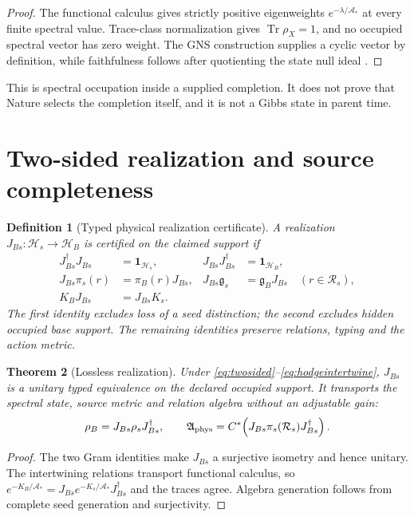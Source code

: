 \documentclass[11pt,a4paper]{article}
\newtheorem{definition}{Definition}[section]
\newtheorem{theorem}[definition]{Theorem}
\theoremstyle{remark}
\newcommand{\Aphys}{\mathfrak A_{\rm phys}}
\newcommand{\Hseed}{\mathcal H_s}
\newcommand{\Hbase}{\mathcal H_B}
\newcommand{\Tr}{\operatorname{Tr}}
\newcommand{\id}{\mathbf 1}
\begin{document}
\begin{proof}
The functional calculus gives strictly positive eigenweights
$e^{-\lambda/\mathcal A_*}$ at every finite spectral value.  Trace-class
normalization gives $\Tr\rho_X=1$, and no occupied spectral vector has zero
weight.  The GNS construction supplies a cyclic vector by definition, while
faithfulness follows after quotienting the state null ideal
\cite{gns1947,bratteli1987}.
\end{proof}

This is spectral occupation inside a supplied completion.  It does not prove
that Nature selects the completion itself, and it is not a Gibbs state in
parent time.

\section{Two-sided realization and source completeness}

\begin{definition}[Typed physical realization certificate]
A realization $J_{Bs}:\Hseed\to\Hbase$ is certified on the claimed support if
\begin{align}
 J_{Bs}^\dagger J_{Bs}&=\id_{\Hseed},
 &J_{Bs}J_{Bs}^\dagger&=\id_{\Hbase},
 \label{eq:twosided}\\
 J_{Bs}\pi_s(r)&=\pi_B(r)J_{Bs},
 &J_{Bs}\mathfrak g_s&=\mathfrak g_BJ_{Bs}
 \quad(r\in\mathcal R_s),
 \label{eq:intertwine}\\
 K_BJ_{Bs}&=J_{Bs}K_s.
 \label{eq:hodgeintertwine}
\end{align}
The first identity excludes loss of a seed distinction; the second excludes
hidden occupied base support.  The remaining identities preserve relations,
typing and the action metric.
\end{definition}

\begin{theorem}[Lossless realization]
Under \eqref{eq:twosided}--\eqref{eq:hodgeintertwine}, $J_{Bs}$ is a unitary
typed equivalence on the declared occupied support.  It transports the
spectral state, source metric and relation algebra without an adjustable gain:
\begin{equation}
 \rho_B=J_{Bs}\rho_sJ_{Bs}^\dagger,
 \qquad
 \Aphys=C^*\!\left(J_{Bs}\pi_s(\mathcal R_s)J_{Bs}^\dagger\right).
 \label{eq:transport}
\end{equation}
\end{theorem}

\begin{proof}
The two Gram identities make $J_{Bs}$ a surjective isometry and hence unitary.
The intertwining relations transport functional calculus, so
$e^{-K_B/\mathcal A_*}=J_{Bs}e^{-K_s/\mathcal A_*}J_{Bs}^\dagger$ and the
traces agree.  Algebra generation follows from complete seed generation and
surjectivity.
\end{proof}
\end{document}
